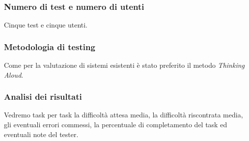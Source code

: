 \subsubsection*{Numero di test e numero di utenti}
Cinque test e cinque utenti.
\subsubsection*{Metodologia di testing}
Come per la valutazione di sistemi esistenti è stato preferito il metodo
\emph{Thinking Aloud}.
\subsubsection*{Analisi dei risultati}
Vedremo task per task la difficoltà attesa media, la difficoltà
 riscontrata media, gli eventuali errori commessi, la percentuale di
completamento del task ed eventuali note del tester.

